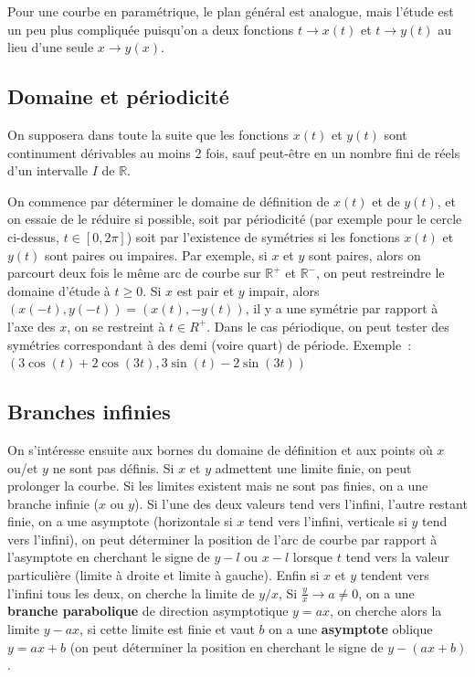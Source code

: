 \documentclass[a4paper,11pt]{book}
\begin{document}
\begin{giacjshere}
Pour une courbe en param\'etrique, le plan g\'en\'eral est analogue,
mais l'\'etude est un peu plus compliqu\'ee puisqu'on a 
deux fonctions $t \rightarrow x(t)$ et $t \rightarrow y(t)$
au lieu d'une seule $x \rightarrow y(x)$.

\subsection{Domaine et p\'eriodicit\'e}
On supposera dans toute la suite que les fonctions $x(t)$ et $y(t)$
sont continument d\'erivables au moins 2 fois, sauf peut-\^etre
en un nombre fini de r\'eels d'un intervalle $I$ de $\mathbb{R}$.

On commence par d\'eterminer le domaine de d\'efinition de $x(t)$
et de $y(t)$, et on essaie de le r\'eduire si possible, soit par
p\'eriodicit\'e (par exemple pour le cercle ci-dessus, $t \in [0,2 \pi]$)
soit par l'existence de sym\'etries si les fonctions
$x(t)$ et $y(t)$ sont paires ou impaires. Par exemple, si $x$ et $y$
sont paires, alors on parcourt deux fois le m\^eme arc de courbe
sur $\mathbb{R}^+$ et $\mathbb{R}^-$, on peut restreindre le domaine d'\'etude
\`a $t\geq 0$. Si $x$ est pair et $y$ impair, alors 
$(x(-t),y(-t))=(x(t),-y(t))$, il y a une sym\'etrie par rapport \`a
l'axe des $x$, on se restreint \`a $t \in R^+$.
Dans le cas p\'eriodique, on peut tester des sym\'etries correspondant
\`a des demi (voire quart) de p\'eriode.
Exemple~: $(3\cos(t)+2\cos(3t),3\sin(t)-2\sin(3t))$ 

\subsection{Branches infinies}
On s'int\'eresse ensuite aux bornes du domaine de d\'efinition
et aux points o\`u $x$ ou/et $y$ ne sont pas d\'efinis.
Si $x$ et $y$ admettent une limite finie, on peut prolonger la
courbe. Si les limites existent mais ne sont pas finies, 
on a une branche infinie ($x$ ou $y$). Si l'une des deux
valeurs tend vers l'infini, l'autre restant finie, on a une
asymptote (horizontale si $x$ tend vers l'infini, verticale
si $y$ tend vers l'infini), on peut d\'eterminer la position
de l'arc de courbe par rapport \`a l'asymptote en
cherchant le signe de $y-l$ ou $x-l$ lorsque $t$ tend
vers la valeur particuli\`ere (limite \`a droite et limite
\`a gauche). Enfin si $x$ et $y$ tendent vers l'infini
tous les deux, on cherche la limite de $y/x$,
Si $\frac{y}{x} \rightarrow a \neq 0$, on a une 
{\bf branche parabolique} 
de direction asymptotique $y=ax$,
on cherche alors la limite
$y-ax$, si cette limite est finie et vaut $b$ 
on a une {\bf asymptote} oblique $y=ax+b$ (on peut d\'eterminer
la position en cherchant le signe de $y-(ax+b)$.


\end{giacjshere}
\end{document}
